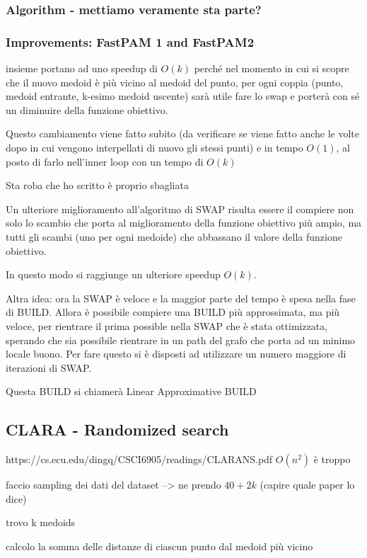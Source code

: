 \subsubsection{Algorithm - mettiamo veramente sta parte?}
\subsubsection{Improvements: FastPAM 1 and FastPAM2}
insieme portano ad uno speedup di $O(k)$ perché nel momento in cui si scopre che il nuovo medoid è più vicino al medoid del punto, per ogni coppia (punto, medoid entrante, k-esimo medoid uscente) sarà utile fare lo swap e porterà con sé un diminuire della funzione obiettivo.

Questo cambiamento viene fatto subito (da verificare se viene fatto anche le volte dopo in cui vengono interpellati di nuovo gli stessi punti) e in tempo $O(1)$, al posto di farlo nell'inner loop con un tempo di $O(k)$

Sta roba che ho scritto è proprio sbagliata

Un ulteriore miglioramento all'algoritmo di SWAP risulta essere il compiere non solo lo scambio che porta al miglioramento della funzione obiettivo più ampio, ma tutti gli scambi (uno per ogni medoide) che abbassano il valore della funzione obiettivo.

In questo modo si raggiunge un ulteriore speedup $O(k)$.

Altra idea: ora la SWAP è veloce e la maggior parte del tempo è spesa nella fase di BUILD. Allora è possibile compiere una BUILD più approssimata, ma più veloce, per rientrare il prima possible nella SWAP che è stata ottimizzata, sperando che sia possibile rientrare in un path del grafo che porta ad un minimo locale buono. Per fare questo si è disposti ad utilizzare un numero maggiore di iterazioni di SWAP.

Questa BUILD si chiamerà Linear Approximative BUILD
\subsection{CLARA - Randomized search}
https://cs.ecu.edu/dingq/CSCI6905/readings/CLARANS.pdf
$O(n^2)$ è troppo

faccio sampling dei dati del dataset --> ne prendo $40 + 2k$ (capire quale paper lo dice)

trovo k medoids

calcolo la somma delle distanze di ciascun punto dal medoid più vicino

